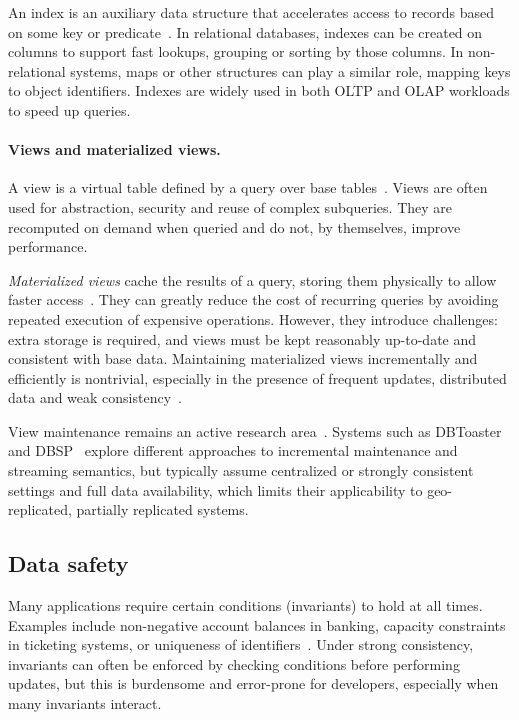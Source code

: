 An index is an auxiliary data structure that accelerates access to records based
on some key or predicate~\cite{silberschatz2005database,graefe2011modern}. In relational
databases, indexes can be created on columns to support fast lookups, grouping or
sorting by those columns. In non-relational systems, maps or other structures
can play a similar role, mapping keys to object identifiers. Indexes are widely
used in both OLTP and OLAP workloads to speed up queries.

\paragraph{Views and materialized views.}

A view is a virtual table defined by a query over base tables~\cite{silberschatz2005database}.
Views are often used for abstraction, security and reuse of complex subqueries.
They are recomputed on demand when queried and do not, by themselves, improve
performance.

\emph{Materialized views} cache the results of a query, storing them physically
to allow faster access~\cite{silberschatz2005database,dbtoaster,analyticdb}. They can greatly
reduce the cost of recurring queries by avoiding repeated execution of expensive
operations. However, they introduce challenges: extra storage is required, and
views must be kept reasonably up-to-date and consistent with base data. Maintaining
materialized views incrementally and efficiently is nontrivial, especially in
the presence of frequent updates, distributed data and weak
consistency~\cite{dbtoaster,dbsp,analyticdb}.

View maintenance remains an active research area~\cite{dbtoaster,dbsp,analyticdb}.
Systems such as DBToaster~\cite{dbtoaster} and DBSP~\cite{dbsp} explore different
approaches to incremental maintenance and streaming semantics, but typically
assume centralized or strongly consistent settings and full data availability,
which limits their applicability to geo-replicated, partially replicated systems.

\subsection{Data safety}
\label{sec:data-safety}

Many applications require certain conditions (invariants) to hold at all
times. Examples include non-negative account balances in banking, capacity
constraints in ticketing systems, or uniqueness of identifiers~\cite{avoidence,ipa}.
Under strong consistency, invariants can often be enforced by checking
conditions before performing updates, but this is burdensome and error-prone for
developers, especially when many invariants interact.

